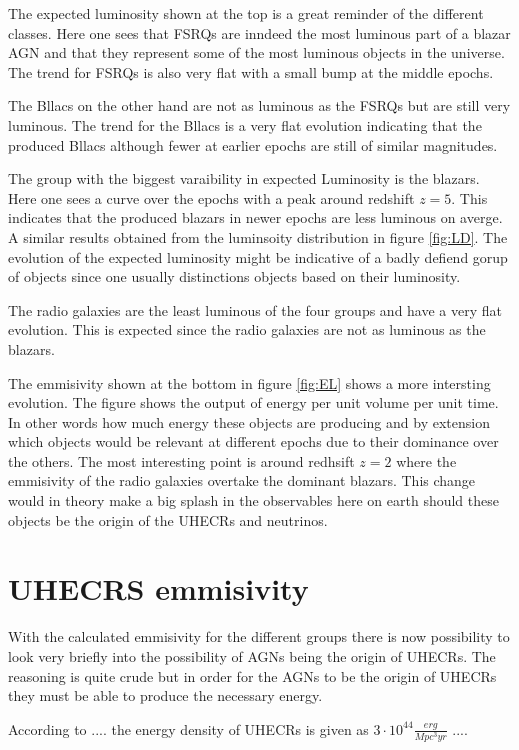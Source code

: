 \documentclass{article}
\begin{document}
The expected luminosity shown at the top is a great reminder of the different classes. Here one sees that FSRQs are inndeed the most luminous part of a blazar AGN and 
that they represent some of the most luminous objects in the universe. The trend for FSRQs is also very flat with a small bump at the middle epochs. 

The Bllacs on the other hand are not as luminous as the FSRQs but are still very luminous. 
The trend for the Bllacs is a very flat evolution indicating that the produced Bllacs although fewer at earlier epochs are still 
of similar magnitudes.

The group with the biggest varaibility in expected Luminosity is the blazars. Here one sees a curve over the epochs with a peak around redshift $z=5$. 
This indicates that the produced blazars in newer epochs are less luminous on averge. A similar results obtained from the luminsoity distribution in figure \ref{fig:LD}.
The evolution of the expected luminosity might be indicative of a badly defiend gorup of objects since one usually distinctions objects based on their luminosity.

The radio galaxies are the least luminous of the four groups and have a very flat evolution. This is expected since the radio galaxies are not as luminous as the blazars.

The emmisivity shown at the bottom in figure \ref{fig:EL} shows a more intersting evolution. The figure shows the output of energy per unit volume per unit time. In other words 
how much energy these objects are producing and by extension which objects would be relevant at different epochs due to their dominance over the others.
The most interesting point is around redhsift $z=2$ where the emmisivity of the radio galaxies overtake the dominant blazars. This change would in theory make
a big splash in the observables here on earth should these objects be the origin of the UHECRs and neutrinos. 



\section{UHECRS emmisivity}
With the calculated emmisivity for the different groups there is now possibility to look very briefly into the possibility of AGNs being the origin of UHECRs. The 
reasoning is quite crude but in order for the AGNs to be the origin of UHECRs they must be able to produce the necessary energy. 

According to .... the energy density of UHECRs is given as $3 \cdot 10^{44}\frac{erg}{Mpc^3yr}$ ....
\end{document}
